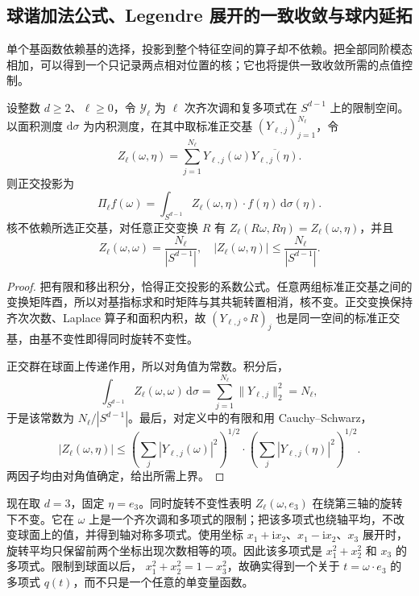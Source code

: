\subsection{球谐加法公式、Legendre 展开的一致收敛与球内延拓}
\label{b2:subsec:B20304}

单个基函数依赖基的选择，投影到整个特征空间的算子却不依赖。把全部同阶模态相加，可以得到一个只记录两点相对位置的核；它也将提供一致收敛所需的点值控制。

\begin{proposition}[球谐投影核]
\label{b2:prop:B2-spherical-projection-kernel}
设整数 \(d\geq2\)、\(\ell\geq0\)，令 \(\mathcal Y_\ell\)
为 \(\ell\) 次齐次调和复多项式在 \(S^{d-1}\) 上的限制空间。
以面积测度 \(\mathrm d\sigma\) 为内积测度，在其中取标准正交基
\((Y_{\ell,j})_{j=1}^{N_\ell}\)，令
\[
 Z_\ell(\omega,\eta)=\sum_{j=1}^{N_\ell}
       Y_{\ell,j}(\omega)\overline{Y_{\ell,j}(\eta)}.
\]
则正交投影为
\[
 \Pi_\ell f(\omega)
       =\int_{S^{d-1}}Z_\ell(\omega,\eta)\cdot f(\eta)\,\mathrm d\sigma(\eta).
\]
核不依赖所选正交基，对任意正交变换 \(R\) 有
\(Z_\ell(R\omega,R\eta)=Z_\ell(\omega,\eta)\)，并且
\[
 Z_\ell(\omega,\omega)=\frac{N_\ell}{|S^{d-1}|},
 \quad
 |Z_\ell(\omega,\eta)|\leq\frac{N_\ell}{|S^{d-1}|}.
\]
\end{proposition}
\begin{proof}
把有限和移出积分，恰得正交投影的系数公式。任意两组标准正交基之间的变换矩阵酉，所以对基指标求和时矩阵与其共轭转置相消，核不变。正交变换保持齐次次数、Laplace 算子和面积内积，故
\((Y_{\ell,j}\circ R)_j\) 也是同一空间的标准正交基，由基不变性即得同时旋转不变性。

正交群在球面上传递作用，所以对角值为常数。积分后，
\[
 \int_{S^{d-1}}Z_\ell(\omega,\omega)\,\mathrm d\sigma
       =\sum_{j=1}^{N_\ell}\|Y_{\ell,j}\|_2^2=N_\ell,
\]
于是该常数为 \(N_\ell/|S^{d-1}|\)。最后，对定义中的有限和用 Cauchy--Schwarz，
\[
 |Z_\ell(\omega,\eta)|
 \leq
 \left(\sum_j|Y_{\ell,j}(\omega)|^2\right)^{1/2}
 \cdot
 \left(\sum_j|Y_{\ell,j}(\eta)|^2\right)^{1/2}.
\]
两因子均由对角值确定，给出所需上界。
\end{proof}

现在取 \(d=3\)，固定 \(\eta=e_3\)。同时旋转不变性表明
\(Z_\ell(\omega,e_3)\) 在绕第三轴的旋转下不变。它在 \(\omega\) 上是一个齐次调和多项式的限制；把该多项式也绕轴平均，不改变球面上的值，并得到轴对称多项式。使用坐标
\(x_1+\mathrm ix_2\)、\(x_1-\mathrm ix_2\)、\(x_3\) 展开时，旋转平均只保留前两个坐标出现次数相等的项。因此该多项式是
\(x_1^2+x_2^2\) 和 \(x_3\) 的多项式。限制到球面以后，
\(x_1^2+x_2^2=1-x_3^2\)，故确实得到一个关于
\(t=\omega\cdot e_3\) 的多项式 \(q(t)\)，而不只是一个任意的单变量函数。

